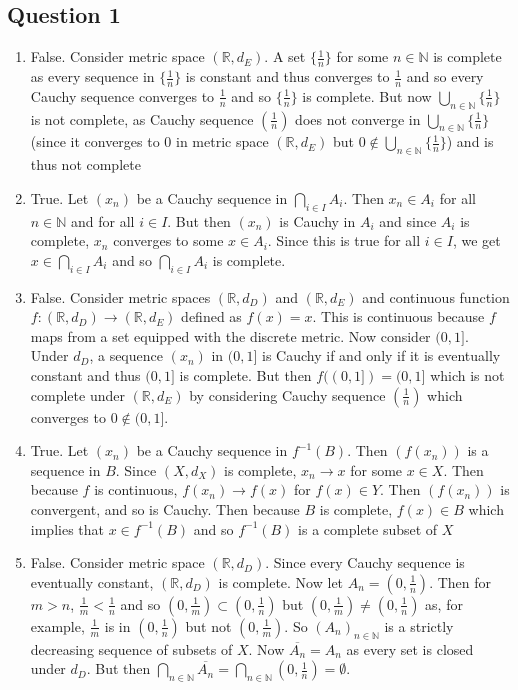 \documentclass[letterpaper, 11pt]{article}
\newcommand{\R}{\mathbb{R}}   %
\newcommand{\N}{\mathbb{N}}   %
\newcommand{\1}{\mathds{1}}	%
\theoremstyle{definition}
\begin{document}
\subsection*{Question 1}

\begin{enumerate}[label=(\alph*)]
\item False. Consider metric space $(\R, d_E)$. A set $\{\frac{1}{n}\}$ for some $n \in \N$ is complete as every sequence in $\{\frac{1}{n}\}$ is constant and thus converges to $\frac{1}{n}$ and so every Cauchy sequence converges to $\frac{1}{n}$ and so $\{\frac{1}{n}\}$ is complete. But now $\bigcup \limits _{n \in \N} \{\frac{1}{n}\}$ is not complete, as Cauchy sequence $(\frac{1}{n})$ does not converge in $\bigcup \limits _{n \in \N} \{\frac{1}{n}\}$ (since it converges to $0$ in metric space $(\R, d_E)$ but $0 \notin \bigcup \limits _{n \in \N} \{\frac{1}{n}\}$) and is thus not complete

\item True. Let $(x_n)$ be a Cauchy sequence in $\bigcap \limits _{i \in I}A_i$. Then $x_n \in A_i$ for all $n \in \N$ and for all $i \in I$. But then $(x_n)$ is Cauchy in $A_i$ and since $A_i$ is complete, $x_n$ converges to some $x \in A_i$. Since this is true for all $i \in I$, we get $x \in \bigcap \limits _{i \in I}A_i$ and so $\bigcap \limits _{i\in I}A_i$ is complete.

\item False. Consider metric spaces $(\R, d_D)$ and $(\R, d_E)$ and continuous function $f: (\R, d_D) \to (\R, d_E)$ defined as $f(x)=x$. This is continuous because $f$ maps from a set equipped with the discrete metric. Now consider $(0,1]$. Under $d_D$, a sequence $(x_n)$ in $(0,1]$ is Cauchy if and only if it is eventually constant and thus $(0,1]$ is complete. But then $f((0,1])=(0,1]$ which is not complete under $(\R, d_E)$ by considering Cauchy sequence $(\frac{1}{n})$ which converges to $0 \notin (0,1]$. 

\item True. Let $(x_n)$ be a Cauchy sequence in $f^{-1}(B)$. Then $(f(x_n))$ is a sequence in $B$. Since $(X, d_X)$ is complete, $x_n \to x$ for some $x \in X$. Then because $f$ is continuous, $f(x_n) \to f(x)$ for $f(x) \in Y$. Then $(f(x_n))$ is convergent, and so is Cauchy. Then because $B$ is complete, $f(x) \in B $ which implies that $x \in f^{-1}(B)$ and so $f^{-1}(B)$ is a complete subset of $X$

\item False. Consider metric space $(\R, d_D)$. Since every Cauchy sequence is eventually constant, $(\R, d_D)$ is complete. Now let $A_n = (0,\frac{1}{n})$. Then for $m > n$, $\frac{1}{m} < \frac{1}{n}$ and so $(0, \frac{1}{m}) \subset (0, \frac{1}{n})$ but $(0, \frac{1}{m}) \ne (0, \frac{1}{n})$ as, for example, $\frac{1}{m}$ is in $(0, \frac{1}{n})$ but not $(0, \frac{1}{m})$. So $(A_n)_{n \in \N}$ is a strictly decreasing sequence of subsets of $X$. Now $\overline{A_n} = A_n$ as every set is closed under $d_D$. But then $\bigcap \limits _{n \in \N} \overline{A_n} = \bigcap \limits _{n \in \N} (0,\frac{1}{n}) = \emptyset$. 


\end{enumerate}
\end{document}
